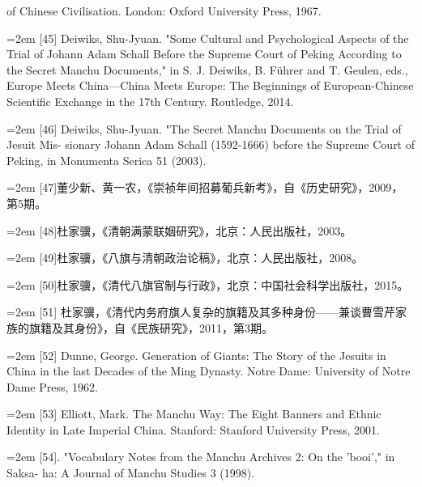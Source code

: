 \space%
of Chinese Civilisation. London: Oxford University Press, 1967.%
\par
\noindent\hangindent=2em
[45] Deiwiks, Shu-Jyuan. "Some Cultural and Psychological Aspects of the Trial%
\space%
of Johann Adam Schall Before the Supreme Court of Peking According to the%
\space%
Secret Manchu Documents," in S. J. Deiwiks, B. Führer and T. Geulen, eds.,%
\space%
Europe Meets China—China Meets Europe: The Beginnings of European-Chinese%
\space%
Scientific Exchange in the 17th Century. Routledge, 2014.%
\par
\noindent\hangindent=2em
[46] Deiwiks, Shu-Jyuan. "The Secret Manchu Documents on the Trial of Jesuit Mis-%
sionary Johann Adam Schall (1592-1666) before the Supreme Court of Peking,%
\space%
in Monumenta Serica 51 (2003).%
\par
\noindent\hangindent=2em
[47]董少新、黄一农，《崇祯年间招募葡兵新考》，自《历史研究》，2009，%
第5期。%
\par
\noindent\hangindent=2em
[48]杜家骥，《清朝满蒙联姻研究》，北京：人民出版社，2003。%
\par
\noindent\hangindent=2em
[49]杜家骥，《八旗与清朝政治论稿》，北京：人民出版社，2008。%
\par
\noindent\hangindent=2em
[50]杜家骥，《清代八旗官制与行政》，北京：中国社会科学出版社，2015。%
\par
\noindent\hangindent=2em
[51] 杜家骥，《清代内务府旗人复杂的旗籍及其多种身份——兼谈曹雪芹家%
族的旗籍及其身份》，自《民族研究》，2011，第3期。%
\par
\noindent\hangindent=2em
[52] Dunne, George. Generation of Giants: The Story of the Jesuits in China in the last%
\space%
Decades of the Ming Dynasty. Notre Dame: University of Notre Dame Press, 1962.%
\par
\noindent\hangindent=2em
[53] Elliott, Mark. The Manchu Way: The Eight Banners and Ethnic Identity in Late%
\space%
Imperial China. Stanford: Stanford University Press, 2001.%
\par
\noindent\hangindent=2em
[54]. "Vocabulary Notes from the Manchu Archives 2: On the 'booi'," in Saksa-%
ha: A Journal of Manchu Studies 3 (1998).%
\par
